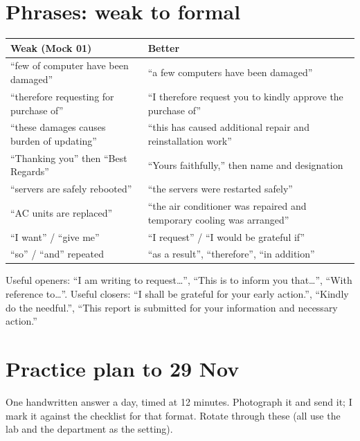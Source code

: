 \documentclass[11pt,a4paper]{article}
\newcommand{\tb}[1]{\textbf{\color{slate}#1}}
\begin{document}
\section{Phrases: weak to formal}
\begin{center}\small\renewcommand{\arraystretch}{1.18}\setlength{\tabcolsep}{9pt}
\begin{tabularx}{\linewidth}{@{}YY@{}}
\toprule
\tb{Weak (Mock 01)} & \tb{Better} \\ \midrule
``few of computer have been damaged'' & ``a few computers have been damaged'' \\
``therefore requesting for purchase of'' & ``I therefore request you to kindly approve the purchase of'' \\
``these damages causes burden of updating'' & ``this has caused additional repair and reinstallation work'' \\
``Thanking you'' then ``Best Regards'' & ``Yours faithfully,'' then name and designation \\
``servers are safely rebooted'' & ``the servers were restarted safely'' \\
``AC units are replaced'' & ``the air conditioner was repaired and temporary cooling was arranged'' \\
``I want'' / ``give me'' & ``I request'' / ``I would be grateful if'' \\
``so'' / ``and'' repeated & ``as a result'', ``therefore'', ``in addition'' \\
\bottomrule
\end{tabularx}\end{center}
Useful openers: ``I am writing to request\ldots'', ``This is to inform you that\ldots'', ``With reference to\ldots''. Useful closers: ``I shall be grateful for your early action.'', ``Kindly do the needful.'', ``This report is submitted for your information and necessary action.''

\section{Practice plan to 29 Nov}
One handwritten answer a day, timed at 12 minutes. Photograph it and send it; I mark it against the checklist for that format. Rotate through these (all use the lab and the department as the setting).
\end{document}
